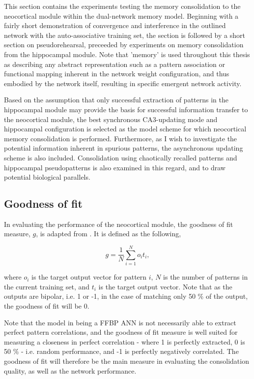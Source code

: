 This section contains the experiments testing the memory consolidation to the neocortical module within the dual-network memory model. Beginning with a fairly short demonstration of convergence and interference in the outlined network with the auto-associative training set, the section is followed by a short section on pseudorehearsal, preceeded by experiments on memory consolidation from the hippocampal module. Note that 'memory' is used throughout this thesis as describing any abstract representation such as a pattern association or functional mapping inherent in the network weight configuration, and thus embodied by the network itself, resulting in specific emergent network activity.

Based on the assumption that only successful extraction of patterns in the hippocampal module may provide the basis for successful information transfer to the neocortical module, the best synchronous CA3-updating mode and hippocampal configuration is selected as the model scheme for which neocortical memory consolidation is performed. Furthermore, as I wish to investigate the potential information inherent in spurious patterns, the asynchronous updating scheme is also included. Consolidation using chaotically recalled patterns and hippocampal pseudopatterns is also examined in this regard, and to draw potential biological parallels.


\subsection{Goodness of fit}\label{sect:goodness-of-fit}

In evaluating the performance of the neocortical module, the goodness of fit measure, $g$, is adapted from \citep{Hattori2010, Hattori2014}. It is defined as the following,

\begin{equation}
    g = \frac{1}{N} \sum_{i=1}^{N}o_it_i,
\end{equation}

where $o_i$ is the target output vector for pattern $i$, $N$ is the number of patterns in the current training set, and $t_i$ is the target output vector. Note that as the outputs are bipolar, i.e. 1 or -1, in the case of matching only 50 \% of the output, the goodness of fit will be 0.

Note that the model in being a FFBP ANN is not necessarily able to extract perfect pattern correlations, and the goodness of fit measure is well suited for measuring a closeness in perfect correlation - where 1 is perfectly extracted, 0 is 50 \% - i.e. random performance, and -1 is perfectly negatively correlated.
The goodness of fit will therefore be the main measure in evaluating the consolidation quality, as well as the network performance.

